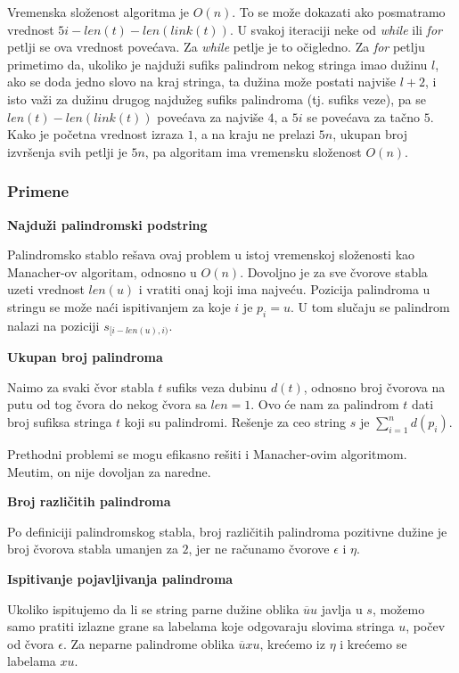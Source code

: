Vremenska slo\v zenost algoritma je $O(n)$. To se mo\v ze dokazati ako posmatramo vrednost $5i-len(t)- len(link(t))$. U svakoj iteraciji neke od \textit{while} ili \textit{for} petlji se ova vrednost pove\' cava. Za \textit{while} petlje je to o\v cigledno. Za \textit{for} petlju primetimo da, ukoliko je najdu\v zi sufiks palindrom nekog stringa imao du\v zinu $l$, ako se doda jedno slovo na kraj stringa, ta du\v zina mo\v ze postati najvi\v se $l+2$, i isto va\v zi za du\v zinu drugog najdu\v zeg sufiks palindroma (tj. sufiks veze), pa se $len(t)- len(link(t))$ pove\' cava za najvi\v se $4$, a $5i$ se pove\'cava za ta\v cno $5$. Kako je po\v cetna vrednost izraza $1$, a na kraju ne prelazi $5n$, ukupan broj izvr\v senja svih petlji je $5n$, pa algoritam ima vremensku slo\v zenost $O(n)$. 

\subsubsection{Primene}

\noindent
\textbf{Najdu\v zi palindromski podstring}

Palindromsko stablo re\v sava ovaj problem u istoj vremenskoj slo\v zenosti kao Manacher-ov algoritam, odnosno u $O(n)$. Dovoljno je za sve \v cvorove stabla uzeti vrednost $len(u)$ i vratiti onaj koji ima najve\' cu. Pozicija palindroma u stringu se mo\v ze na\' ci ispitivanjem za koje $i$ je $p_i = u$. U tom slu\v caju se palindrom nalazi na poziciji $s_{[i-len(u), i)}$.

\noindent
\textbf{Ukupan broj palindroma}

Na\dj imo za svaki \v cvor stabla $t$ sufiks veza dubinu $d(t)$, odnosno broj \v cvorova na putu od tog \v cvora do nekog \v cvora sa $len = 1$. Ovo \' ce nam za palindrom $t$ dati broj sufiksa stringa $t$ koji su palindromi. Re\v senje za ceo string $s$ je $\sum_{i=1}^n d(p_i)$.

Prethodni problemi se mogu efikasno re\v siti i Manacher-ovim algoritmom. Me\dj utim, on nije dovoljan za naredne.

\noindent
\textbf{Broj razli\v citih palindroma}

Po definiciji palindromskog stabla, broj razli\v citih palindroma pozitivne du\v zine je broj \v cvorova stabla umanjen za $2$, jer ne ra\v cunamo \v cvorove $\epsilon$ i $\eta$.

\noindent
\textbf{Ispitivanje pojavljivanja palindroma}

Ukoliko ispitujemo da li se string parne du\v zine oblika $\overline{u}u$ javlja u $s$, mo\v zemo samo pratiti izlazne grane sa labelama koje odgovaraju slovima stringa $u$, po\v cev od \v cvora $\epsilon$. Za neparne palindrome oblika $\overline{u}xu$, kre\' cemo iz $\eta$ i kre\' cemo se labelama $xu$.